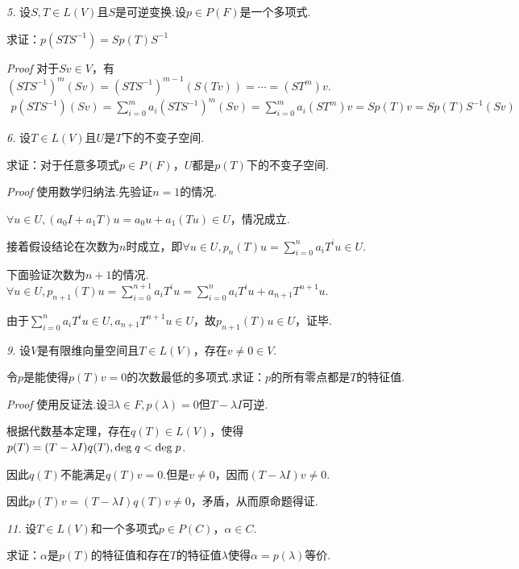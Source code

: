 \hspace*{\fill}

\textit{5.}
设\(S,T \in L(V)\)且\(S\)是可逆变换.设\(p \in P(F)\)是一个多项式.

求证：\(p(STS^{-1})=Sp(T)S^{-1}\)

\textit{Proof}
对于\(Sv \in V\)，有\((STS^{-1})^m (Sv)=(STS^{-1})^{m-1}(S(Tv))=\cdots=(ST^m)v\).
    \begin{align*}
        p(STS^{-1})(Sv)=\sum_{i=0}^m a_i(STS^{-1})^m (Sv) 
        =\sum_{i=0}^m a_i(ST^m)v=Sp(T)v=Sp(T)S^{-1}(Sv)
    \end{align*}

\newpage

\textit{6.}
设\(T \in L(V)\)且\(U\)是\(T\)下的不变子空间.

求证：对于任意多项式\(p \in P(F)\)，\(U\)都是\(p(T)\)下的不变子空间.

\textit{Proof}
使用数学归纳法.先验证\(n=1\)的情况.

\(\forall u \in U,(a_0I+a_1T)u=a_0u+a_1(Tu) \in U\)，情况成立.

接着假设结论在次数为\(n\)时成立，即\(\forall u \in U,p_n(T)u=\sum_{i=0}^n a_iT^iu \in U\).

下面验证次数为\(n+1\)的情况.
\(\forall u \in U,p_{n+1}(T)u=\sum_{i=0}^{n+1} a_iT^iu=\sum_{i=0}^n a_iT^iu+a_{n+1}T^{n+1}u\).

由于\(\sum_{i=0}^n a_iT^iu \in U,a_{n+1}T^{n+1}u \in U\)，故\(p_{n+1}(T)u \in U\)，证毕.

\hspace*{\fill}

\textit{9.}
设\(V\)是有限维向量空间且\(T \in L(V)\)，存在\(v \ne 0 \in V\).

令\(p\)是能使得\(p(T)v=0\)的次数最低的多项式.求证：\(p\)的所有零点都是\(T\)的特征值.

\textit{Proof}
使用反证法.设\(\exists \lambda \in F,p(\lambda)=0\)但\(T-\lambda I\)可逆.

根据代数基本定理，存在\(q(T) \in L(V)\)，使得\(p(T)=(T-\lambda I)q(T),\mathrm{deg \;} q<\mathrm{deg \;} p\).

因此\(q(T)\)不能满足\(q(T)v=0\).但是\(v \ne 0\)，因而\((T-\lambda I)v \ne 0\).

因此\(p(T)v=(T-\lambda I)q(T)v \ne 0\)，矛盾，从而原命题得证.

\hspace*{\fill}

\textit{11.}
设\(T \in L(V)\)和一个多项式\(p \in P(C)\)，\(\alpha \in C\).

求证：\(\alpha\)是\(p(T)\)的特征值和存在\(T\)的特征值\(\lambda\)使得\(\alpha=p(\lambda)\)等价.

